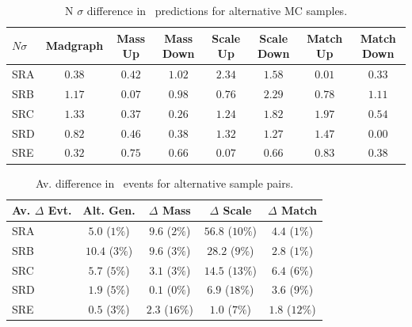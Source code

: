 \begin{table}[!h]
\begin{center}
{\footnotesize
\begin{tabular}{l||c|c|c|c|c|c|c}
\hline
$N \sigma$     & Madgraph & Mass Up & Mass Down & Scale Up & Scale Down &
Match Up & Match Down \\
\hline
\hline
SRA 	 & $0.38$ & $0.42$ & $1.02$ & $2.34$ & $1.58$ & $0.01$ & $0.33$  \\
\hline
SRB 	 & $1.17$ & $0.07$ & $0.98$ & $0.76$ & $2.29$ & $0.78$ & $1.11$  \\
\hline
SRC 	 & $1.33$ & $0.37$ & $0.26$ & $1.24$ & $1.82$ & $1.97$ & $0.54$  \\
\hline
SRD 	 & $0.82$ & $0.46$ & $0.38$ & $1.32$ & $1.27$ & $1.47$ & $0.00$  \\
\hline
SRE 	 & $0.32$ & $0.75$ & $0.66$ & $0.07$ & $0.66$ & $0.83$ & $0.38$  \\
\hline
\end{tabular}}
\caption{ N $\sigma$ difference in \ttdl\ predictions for alternative MC samples. 
\label{tab:nsig}}
\end{center}
\end{table}


\begin{table}[!h]
\begin{center}
\begin{tabular}{l||c|c|c|c}
\hline
Av. $\Delta$ Evt.     & Alt. Gen. & $\Delta$ Mass & $\Delta$ Scale
& $\Delta$ Match \\
\hline
\hline
SRA 	 & $5.0$ ($1\%$) & $9.6$ ($2\%$) & $56.8$ ($10\%$) & $4.4$ ($1\%$)  \\
\hline
SRB 	 & $10.4$ ($3\%$) & $9.6$ ($3\%$) & $28.2$ ($9\%$) & $2.8$ ($1\%$)  \\
\hline
SRC 	 & $5.7$ ($5\%$) & $3.1$ ($3\%$) & $14.5$ ($13\%$) & $6.4$ ($6\%$)  \\
\hline
SRD 	 & $1.9$ ($5\%$) & $0.1$ ($0\%$) & $6.9$ ($18\%$) & $3.6$ ($9\%$)  \\
\hline
SRE 	 & $0.5$ ($3\%$) & $2.3$ ($16\%$) & $1.0$ ($7\%$) & $1.8$ ($12\%$)  \\
\hline
\end{tabular}
\caption{ Av. difference in \ttdl\ events for alternative sample pairs.
\label{tab:devt}}
\end{center}
\end{table}


